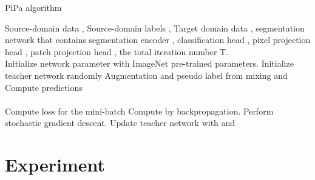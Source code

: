 \documentclass[10pt,twocolumn,letterpaper]{article}
\begin{document}
\begin{algorithm}[t]
\renewcommand{\algorithmicrequire}{\textbf{Input:}}
	\renewcommand{\algorithmicensure}{\textbf{Output:}}
	\caption{PiPa algorithm}
	\label{alg}
	\begin{algorithmic}[1]
 	\REQUIRE Source-domain data , Source-domain labels , Target domain data , segmentation network that contains segmentation encoder , classification head , pixel projection head , patch projection head , the total iteration number T. \\
		\STATE Initialize network parameter  with ImageNet pre-trained parameters. Initialize teacher network  randomly
		\STATE 
        \STATE 
        \STATE 
        \STATE  Augmentation and pseudo label from mixing  and 
        \STATE Compute predictions \\  \\ 
        \STATE Compute loss for the mini-batch    \STATE Compute  by backpropagation.
        \STATE Perform stochastic gradient descent. \STATE Update teacher network  with 
        \ENDFOR
        \RETURN  and 
	\end{algorithmic}  
\end{algorithm}


\section{Experiment}
\end{document}
